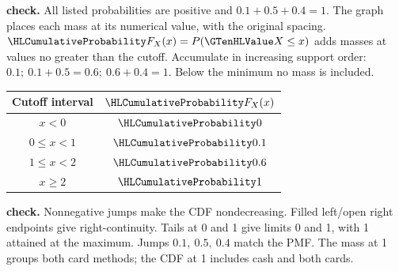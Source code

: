 \textbf{ check.} All listed probabilities are positive and $0.1+0.5+0.4=1$. The graph places each mass at its numerical value, with the original spacing.
$\cTwoCDFHL{F_X(x)}=P(\cTwoValue{X}\leq x)$ adds masses at values no greater than the cutoff. Accumulate in increasing support order: $0.1;\ 0.1+0.5=0.6;\ 0.6+0.4=1$. Below the minimum no mass is included.
\par\noindent\begin{minipage}[t]{.38\linewidth}\vspace{0pt}\centering\begin{tabular}{cc}\toprule Cutoff interval & $\cTwoCDFHL{F_X(x)}$ \\\midrule
$x<0$ & $\cTwoCDFHL{0}$ \\
$0\leq x<1$ & $\cTwoCDFHL{0.1}$ \\
$1\leq x<2$ & $\cTwoCDFHL{0.6}$ \\
$x\geq 2$ & $\cTwoCDFHL{1}$ \\
\bottomrule\end{tabular}\end{minipage}\hfill\begin{minipage}[t]{.59\linewidth}\vspace{0pt}\centering{}\end{minipage}\par
\textbf{ check.} Nonnegative jumps make the CDF nondecreasing. Filled left/open right endpoints give right-continuity. Tails at 0 and 1 give limits 0 and 1, with 1 attained at the maximum. Jumps $0.1,\ 0.5,\ 0.4$ match the PMF. The mass at 1 groups both card methods; the CDF at 1 includes cash and both cards.
\clearpage
